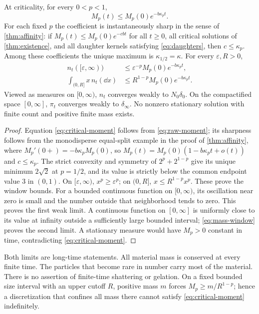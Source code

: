 \begin{corollary}\label{cor:critical}
At criticality, for every $0<p<1$,
\begin{equation}
 M_p(t)\leq M_p(0)e^{-b\kappa_p t}.
 \label{eq:critical-moment}
\end{equation}
For each fixed $p$ the coefficient is instantaneously sharp in the
sense of \cref{thm:affinity}: if $M_p(t)\leq M_p(0)e^{-cbt}$ for all
$t\geq0$, all critical solutions of \cref{thm:existence}, and all daughter
kernels satisfying \eqref{eq:daughters}, then $c\leq\kappa_p$. Among these
coefficients the unique maximum is $\kappa_{1/2}=\kappa$.
For every $\varepsilon,R>0$,
\begin{align}
 n_t([\varepsilon,\infty))
   &\leq\varepsilon^{-p}M_p(0)e^{-b\kappa_p t},\label{eq:number-window}\\
 \int_{(0,R]}x\,n_t(\dd x)
   &\leq R^{1-p}M_p(0)e^{-b\kappa_p t}.\label{eq:mass-window}
\end{align}
Viewed as measures on $[0,\infty)$, $n_t$ converges weakly to
$N_0\delta_0$. On the compactified space $[0,\infty]$, $\pi_t$ converges
weakly to $\delta_\infty$. No nonzero stationary solution with finite count
and positive finite mass exists.
\end{corollary}

\begin{proof}
Equation \eqref{eq:critical-moment} follows from \eqref{eq:raw-moment};
its sharpness follows from the monodisperse equal-split example in the
proof of \cref{thm:affinity}, where $M_p'(0+)=-b\kappa_pM_p(0)$, so
$M_p(t)=M_p(0)(1-b\kappa_pt+o(t))$ and $c\leq\kappa_p$.
The strict convexity and symmetry of $2^p+2^{1-p}$ give its unique minimum
$2\sqrt2$ at $p=1/2$, and its value is strictly below the common endpoint
value $3$ in $(0,1)$.
On $[\varepsilon,\infty)$, $x^p\geq\varepsilon^p$; on $(0,R]$,
$x\leq R^{1-p}x^p$. These prove the window bounds.
For a bounded continuous function on $[0,\infty)$, its oscillation near
zero is small and the number outside that neighborhood tends to zero.
This proves the first weak limit. A continuous function on
$[0,\infty]$ is uniformly close to its value at infinity outside a
sufficiently large bounded interval; \eqref{eq:mass-window} proves the
second limit. A stationary measure would have $M_p>0$ constant in time,
contradicting \eqref{eq:critical-moment}.
\end{proof}

Both limits are long-time statements. All material mass is conserved at
every finite time. The particles that become rare in number carry most
of the material. There is no assertion of finite-time shattering or
gelation. On a fixed bounded size interval with an upper cutoff $R$,
positive mass $m$ forces $M_p\geq m/R^{1-p}$; hence a discretization that
confines all mass there cannot satisfy \eqref{eq:critical-moment}
indefinitely.

